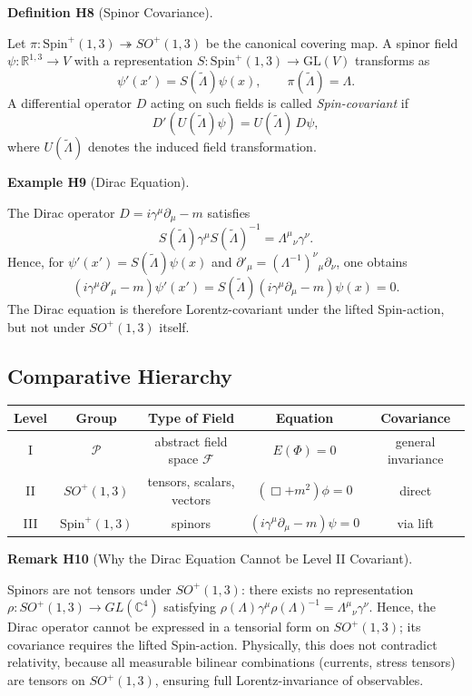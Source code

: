 \documentclass[10pt, letterpaper]{article}
\newcommand{\R}{\mathbb{R}}
\newcommand{\C}{\mathbb{C}}
\newcommand{\GL}{\mathrm{GL}}
\newcommand{\Spin}{\mathrm{Spin}}
\newcommand{\CustomHeading}[3]{%
  \par\medskip\noindent%
  \textbf{#1 #2} \textnormal{(#3)}.\enskip%
}
\newenvironment{DEF}[2]{\begin{unitbox}\CustomHeading{Definition}{#1}{#2}}{\end{unitbox}}
\newenvironment{REM}[2]{\begin{unitbox}\CustomHeading{Remark}{#1}{#2}}{\end{unitbox}}
\newenvironment{EXA}[2]{\begin{unitbox}\CustomHeading{Example}{#1}{#2}}{\end{unitbox}}
\begin{document}
\begin{DEF}{H8}{Spinor Covariance}
Let $\pi:\Spin^+(1,3)\twoheadrightarrow SO^+(1,3)$ be the canonical covering map.  
A spinor field $\psi:\R^{1,3}\to V$ with a representation $S:\Spin^+(1,3)\to\GL(V)$ transforms as
\[
\psi'(x') = S(\widetilde\Lambda)\psi(x),\qquad \pi(\widetilde\Lambda)=\Lambda.
\]
A differential operator $D$ acting on such fields is called \emph{Spin-covariant} if
\[
D'(U(\widetilde\Lambda)\psi)=U(\widetilde\Lambda)\,D\psi,
\]
where $U(\widetilde\Lambda)$ denotes the induced field transformation.
\end{DEF}

\begin{EXA}{H9}{Dirac Equation}
The Dirac operator $D=i\gamma^\mu\partial_\mu-m$ satisfies
\[
S(\widetilde\Lambda)\gamma^\mu S(\widetilde\Lambda)^{-1} = \Lambda^\mu{}_\nu\gamma^\nu.
\]
Hence, for $\psi'(x')=S(\widetilde\Lambda)\psi(x)$ and $\partial'_\mu=(\Lambda^{-1})^\nu{}_\mu\partial_\nu$, one obtains
\[
(i\gamma^\mu\partial'_\mu-m)\psi'(x')
=S(\widetilde\Lambda)(i\gamma^\mu\partial_\mu-m)\psi(x)=0.
\]
The Dirac equation is therefore Lorentz-covariant under the lifted Spin-action, but not under $SO^+(1,3)$ itself.
\end{EXA}

\subsection{Comparative Hierarchy}

\begin{center}
\begin{tabular}{|c|c|c|c|c|}
\hline
\textbf{Level} & \textbf{Group} & \textbf{Type of Field} & \textbf{Equation} & \textbf{Covariance}\\
\hline
I & $\mathcal P$ & abstract field space $\mathcal F$ & $E(\Phi)=0$ & general invariance\\
\hline
II & $SO^+(1,3)$ & tensors, scalars, vectors & $(\Box+m^2)\phi=0$ & direct\\
\hline
III & $\Spin^+(1,3)$ & spinors & $(i\gamma^\mu\partial_\mu-m)\psi=0$ & via lift\\
\hline
\end{tabular}
\end{center}

\begin{REM}{H10}{Why the Dirac Equation Cannot be Level II Covariant}
Spinors are not tensors under $SO^+(1,3)$:  
there exists no representation $\rho:SO^+(1,3)\to GL(\C^4)$ satisfying $\rho(\Lambda)\gamma^\mu\rho(\Lambda)^{-1}=\Lambda^\mu{}_\nu\gamma^\nu$.  
Hence, the Dirac operator cannot be expressed in a tensorial form on $SO^+(1,3)$; its covariance requires the lifted Spin-action.  
Physically, this does not contradict relativity, because all measurable bilinear combinations (currents, stress tensors) are tensors on $SO^+(1,3)$, ensuring full Lorentz-invariance of observables.
\end{REM}
\end{document}
